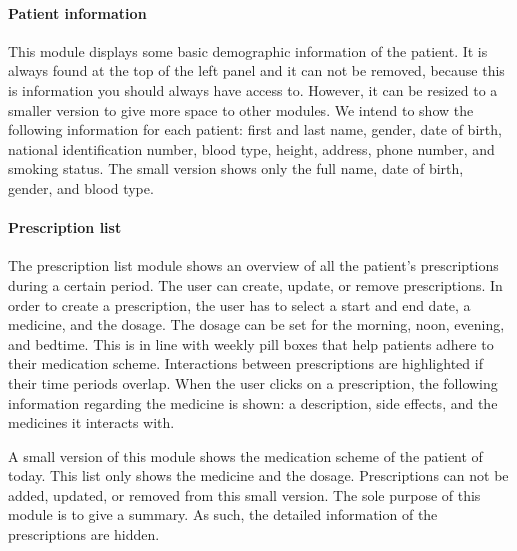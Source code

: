         \paragraph{Patient information} This module displays some basic demographic information of the patient. It is always found at the top of the left panel and it can not be removed, because this is information you should always have access to. However, it can be resized to a smaller version to give more space to other modules. We intend to show the following information for each patient: first and last name, gender, date of birth, national identification number, blood type, height, address, phone number, and smoking status. The small version shows only the full name, date of birth, gender, and blood type.

        \paragraph{Prescription list} The prescription list module shows an overview of all the patient's prescriptions during a certain period. The user can create, update, or remove prescriptions. In order to create a prescription, the user has to select a start and end date, a medicine, and the dosage. The dosage can be set for the morning, noon, evening, and bedtime. This is in line with weekly pill boxes that help patients adhere to their medication scheme. Interactions between prescriptions are highlighted if their time periods overlap. When the user clicks on a prescription, the following information regarding the medicine is shown: a description, side effects, and the medicines it interacts with.

        A small version of this module shows the medication scheme of the patient of today. This list only shows the medicine and the dosage. Prescriptions can not be added, updated, or removed from this small version. The sole purpose of this module is to give a summary. As such, the detailed information of the prescriptions are hidden.

